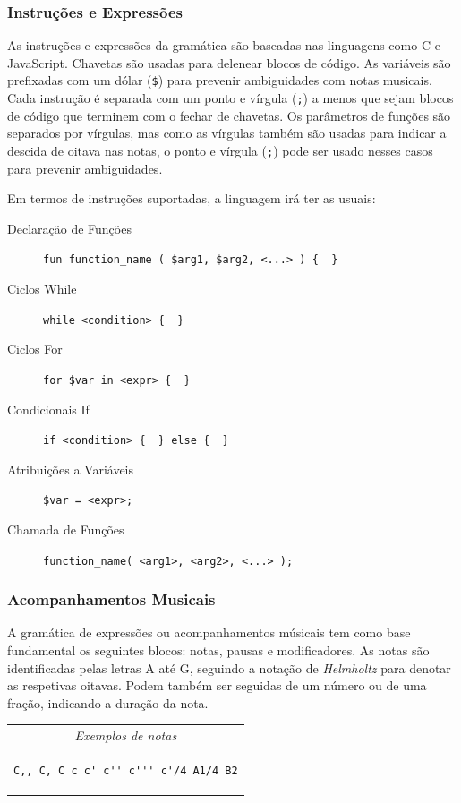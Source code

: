 \documentclass[
  oneside,
  11pt, a4paper,
  footinclude=true,
  headinclude=true,
  cleardoublepage=empty
]{scrbook}
\begin{document}
	\subsubsection{Instruções e Expressões}
	As instruções e expressões da gramática são baseadas nas linguagens como C e JavaScript. Chavetas são usadas para delenear blocos de código. As variáveis são prefixadas com um dólar (\texttt{\$}) para prevenir ambiguidades com notas musicais. Cada instrução é separada com um ponto e vírgula (\texttt{;}) a menos que sejam blocos de código que terminem com o fechar de chavetas. Os parâmetros de funções são separados por vírgulas, mas como as vírgulas também são usadas para indicar a descida de oitava nas notas, o ponto e vírgula (\texttt{;}) pode ser usado nesses casos para prevenir ambiguidades.
	
	Em termos de instruções suportadas, a linguagem irá ter as usuais:
    \begin{description}
     \item[Declaração de Funções] \verb|fun function_name ( $arg1, $arg2, <...> ) {  }|
     \item[Ciclos While] \verb|while <condition> {  }|
     \item[Ciclos For] \verb|for $var in <expr> {  }|
     \item[Condicionais If] \verb|if <condition> {  } else {  }|
     \item[Atribuições a Variáveis] \verb|$var = <expr>;|
     \item[Chamada de Funções] \verb|function_name( <arg1>, <arg2>, <...> );|
    \end{description}
    
	\subsubsection{Acompanhamentos Musicais}
	A gramática de expressões ou acompanhamentos músicais tem como base fundamental os seguintes blocos: notas, pausas e modificadores. As notas são identificadas pelas letras A até G, seguindo a notação de \textit{Helmholtz}\cite{helmholtz-pitch-notation} para denotar as respetivas oitavas. Podem também ser seguidas de um número ou de uma fração, indicando a duração da nota.


\begin{center}
\begin{tabular}{c}
\textit{Exemplos de notas} \\
\begin{lstlisting}[backgroundcolor=\color{transparent}]
C,, C, C c c' c'' c''' c'/4 A1/4 B2
\end{lstlisting}
\end{tabular}
\end{center}
\end{document}
